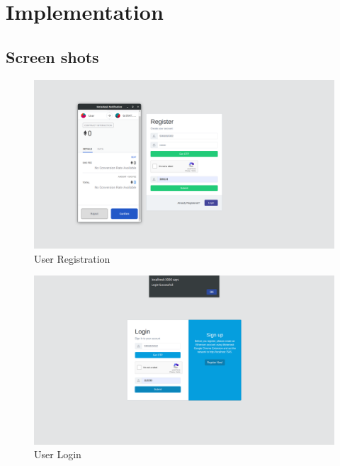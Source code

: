 \chapter{Implementation}


	
	
\section{Screen shots}
\begin{figure}[!h]
	\centering
	\includegraphics[width=\linewidth]{Images/User/UserRegistration.png}
	\caption{User Registration}
\end{figure}
\begin{figure}[!b]
	\centering
	\includegraphics[width=\linewidth]{Images/User/UserLogin.png}
	\caption{User Login}
\end{figure}

